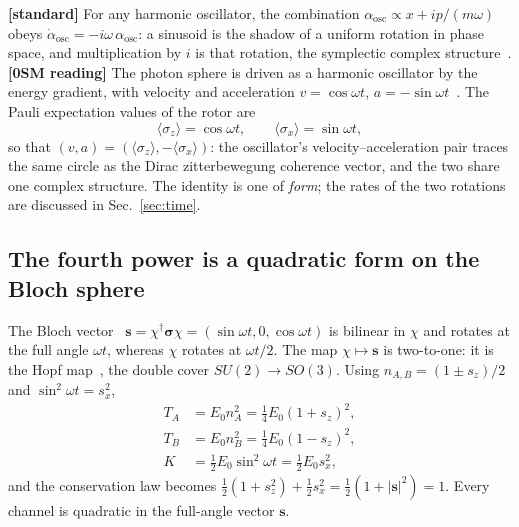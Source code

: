 \documentclass[%
 reprint, amsmath,amssymb, aps, prb, ]{revtex4-2}
\numberwithin{equation}{section}
\newcommand{\Bloch}{\mathbf{s}}
\begin{document}
\textbf{[standard]} For any harmonic oscillator, the combination $\alpha_{\mathrm{osc}}\propto x+ip/(m\omega)$ obeys $\dot\alpha_{\mathrm{osc}}=-i\omega\,\alpha_{\mathrm{osc}}$: a sinusoid is the shadow of a uniform rotation in phase space, and multiplication by $i$ is that rotation, the symplectic complex structure~\cite{ref:arnold}. \textbf{[0SM reading]} The photon sphere is driven as a harmonic oscillator by the energy gradient, with velocity and acceleration $v=\cos\omega t$, $a=-\sin\omega t$~\cite{ref:p10}. The Pauli expectation values of the rotor are
\begin{equation}
\langle\sigma_z\rangle=\cos\omega t,\qquad \langle\sigma_x\rangle=\sin\omega t ,
\label{eq:pauli}
\end{equation}
so that $(v,a)=(\langle\sigma_z\rangle,-\langle\sigma_x\rangle)$: the oscillator's velocity--acceleration pair traces the same circle as the Dirac zitterbewegung coherence vector, and the two share one complex structure. The identity is one of \emph{form}; the rates of the two rotations are discussed in Sec.~\ref{sec:time}.

\subsection{The fourth power is a quadratic form on the Bloch sphere}

The Bloch vector~\cite{ref:bloch46} $\Bloch=\chi^\dagger\bm{\sigma}\chi=(\sin\omega t,0,\cos\omega t)$ is bilinear in $\chi$ and rotates at the full angle $\omega t$, whereas $\chi$ rotates at $\omega t/2$. The map $\chi\mapsto\Bloch$ is two-to-one: it is the Hopf map~\cite{ref:hopf}, the double cover $SU(2)\to SO(3)$. Using $n_{A,B}=(1\pm s_z)/2$ and $\sin^2\omega t=s_x^2$,
\begin{align}
T_A&=E_0n_A^2=\tfrac14E_0(1+s_z)^2, \label{eq:TAq}\\
T_B&=E_0n_B^2=\tfrac14E_0(1-s_z)^2, \label{eq:TBq}\\
K&=\tfrac12E_0\sin^2\omega t=\tfrac12E_0s_x^2 , \label{eq:Kq}
\end{align}
and the conservation law becomes $\tfrac12(1+s_z^2)+\tfrac12s_x^2=\tfrac12(1+|\Bloch|^2)=1$. Every channel is quadratic in the full-angle vector $\Bloch$.
\end{document}
